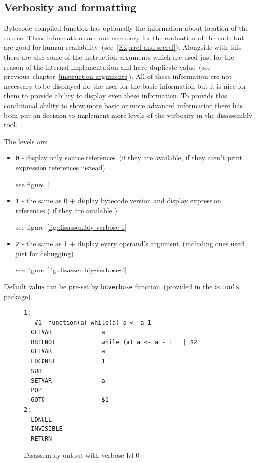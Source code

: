 \documentclass[thesis=M,english]{FITthesis}[2018/10/20]
\newcommand{\code}[1]{\texttt{#1}}
\begin{document}
\subsection{Verbosity and formatting}

Bytecode compiled function has optionally the information about location of the source. These informations are not neccesary for the evaluation of the code but are good for human-readability~(see~\ref{Exprref-and-srcref}). Alongside with this there are also some of the instruction arguments which are used just for the reason of the internal implementation and have duplicate value~(see previous~chapter~\ref{instruction-arguments}). All of these information are not necessary to be displayed for the user for the basic information but it is nice for them to provide ability to display even these information. To provide this conditional ability to show more basic or more advanced information there has been put an decision to implement more levels of the verbosity in the disassembly tool.

The levels are:

\begin{itemize}
	\item \code{0} - display only source references~(if they are available, if they aren't print expression references instead)

	see figure~\ref{fig:disassembly-verbose-0}	
	
	\item \code{1} - the same as 0 + display bytecode version and display expression references ( if they are available )

	see figure~\ref{fig:disassembly-verbose-1}	

	\item \code{2} - the same as 1 + display every operand's argument~(including ones used just for debugging)

	see figure~\ref{fig:disassembly-verbose-2}	

\end{itemize}

Default value can be pre-set by \code{bcverbose} function~(provided in the \code{bctools} package).

\begin{figure}[h]
\begin{lstlisting}
1:
 - #1: function(a) while(a) a <- a-1
  GETVAR              a
  BRIFNOT             while (a) a <- a - 1	 | $2
  GETVAR              a
  LDCONST             1
  SUB                 
  SETVAR              a
  POP                 
  GOTO                $1
2:
  LDNULL              
  INVISIBLE           
  RETURN              
\end{lstlisting}
	\caption{Disassembly output with verbose lvl 0}\label{fig:disassembly-verbose-0}
\end{figure}
\end{document}
